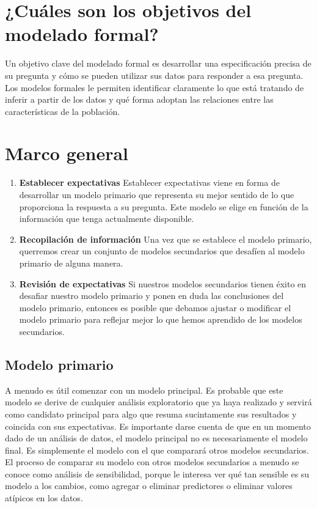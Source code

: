 \documentclass[10pt]{book}
\begin{document}
    \section{¿Cuáles son los objetivos del modelado formal?}
    Un objetivo clave del modelado formal es desarrollar una especificación precisa de su pregunta y cómo se pueden utilizar sus datos para responder a esa pregunta. Los modelos formales le permiten identificar claramente lo que está tratando de inferir a partir de los datos y qué forma adoptan las relaciones entre las características de la población.
    \section{Marco general}
    \begin{enumerate}[\bfseries 1.]
	\item \textbf{Establecer expectativas} Establecer expectativas viene en forma de desarrollar un modelo primario que representa su mejor sentido de lo que proporciona la respuesta a su pregunta. Este modelo se elige en función de la información que tenga actualmente disponible. 
	\item \textbf{Recopilación de información} Una vez que se establece el modelo primario, querremos crear un conjunto de modelos secundarios que desafíen al modelo primario de alguna manera. 
	\item \textbf{Revisión de expectativas} Si nuestros modelos secundarios tienen éxito en desafiar nuestro modelo primario y ponen en duda las conclusiones del modelo primario, entonces es posible que debamos ajustar o modificar el modelo primario para reflejar mejor lo que hemos aprendido de los modelos secundarios.
    \end{enumerate}
	\subsection{Modelo primario}
	A menudo es útil comenzar con un modelo principal. Es probable que este modelo se derive de cualquier análisis exploratorio que ya haya realizado y servirá como candidato principal para algo que resuma sucintamente sus resultados y coincida con sus expectativas. Es importante darse cuenta de que en un momento dado de un análisis de datos, el modelo principal no es necesariamente el modelo final. Es simplemente el modelo con el que comparará otros modelos secundarios. El proceso de comparar su modelo con otros modelos secundarios a menudo se conoce como análisis de sensibilidad, porque le interesa ver qué tan sensible es su modelo a los cambios, como agregar o eliminar predictores o eliminar valores atípicos en los datos.
\end{document}

